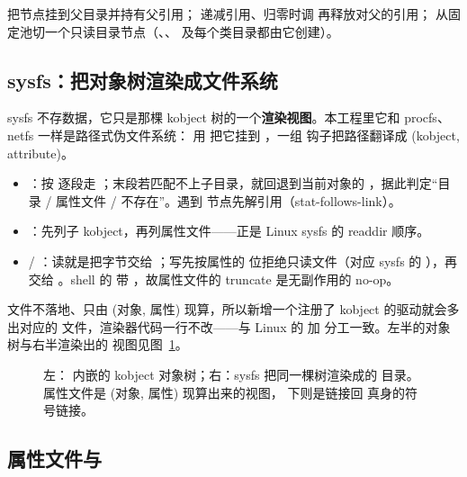  把节点挂到父目录并持有父引用； 递减引用、归零时调  再释放对父的引用； 从固定池切一个只读目录节点（、、 及每个类目录都由它创建）。

\subsection{sysfs：把对象树渲染成文件系统}

sysfs 不存数据，它只是那棵 kobject 树的一个\textbf{渲染视图}。本工程里它和 procfs、netfs 一样是路径式伪文件系统： 用  把它挂到 ，一组  钩子把路径翻译成 (kobject, attribute)。

\begin{itemize}
  \item {}：按 \code{/} 逐段走 ；末段若匹配不上子目录，就回退到当前对象的 ，据此判定“目录 / 属性文件 / 不存在”。遇到  节点先解引用（stat-follows-link）。
  \item {}：先列子 kobject，再列属性文件——正是 Linux sysfs 的 readdir 顺序。
  \item {} / ：读就是把字节交给 ；写先按属性的  位拒绝只读文件（对应 sysfs 的 ），再交给 。shell 的 \code{>} 带 ，故属性文件的 truncate 是无副作用的 no-op。
\end{itemize}

文件不落地、只由 (对象, 属性) 现算，所以新增一个注册了 kobject 的驱动就会多出对应的  文件，渲染器代码一行不改——与 Linux 的  加  分工一致。左半的对象树与右半渲染出的  视图见图~\ref{fig:kobject-sysfs}。

\begin{figure}[p]
  \centering
  \resizebox{\linewidth}{!}{}
  \caption{左： 内嵌的 kobject 对象树；右：sysfs 把同一棵树渲染成的  目录。属性文件是 (对象, 属性) 现算出来的视图， 下则是链接回  真身的符号链接。}
  \label{fig:kobject-sysfs}
\end{figure}

\subsection{属性文件与 }

